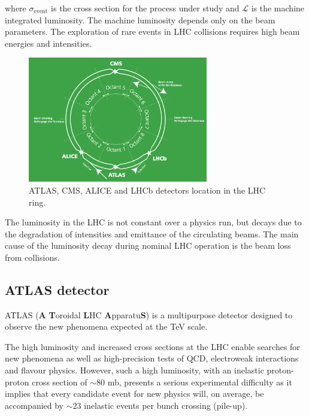 \documentclass[12pt, twoside]{article}
\numberwithin{equation}{section}
\numberwithin{figure}{section}
\begin{document}
where $\sigma_{\text{event}}$ is the cross section for the process under study and $\mathcal{L}$ is the machine integrated luminosity. The machine luminosity depends only on the beam parameters. The exploration of rare events in LHC collisions requires high beam energies and intensities.
\begin{figure}[h]
    \centering
    \includegraphics[width=0.7\textwidth]{./images/ExperimentsAtLHC.png}
    \captionsetup{width=0.9\textwidth}
    \caption{ATLAS, CMS, ALICE and LHCb detectors location in the LHC ring.}
    \label{fig:LHCScheme}
\end{figure}

The luminosity in the LHC is not constant over a physics run, but decays due to the degradation of intensities and emittance of the circulating beams. The main cause of the luminosity decay during nominal LHC operation is the beam loss from collisions.

\subsection{ATLAS detector}
\label{subsec:ATLASDetector}

ATLAS (\textbf{A} \textbf{T}oroidal \textbf{L}HC \textbf{A}pparatu\textbf{S}) is a multipurpose detector designed to observe the new phenomena expected at the TeV scale.

The high luminosity and increased cross sections at the LHC enable searches for new phenomena as well as high-precision tests of QCD, electroweak interactions and flavour physics. However, such a high luminosity, with an inelastic proton-proton cross section of $\sim 80$ mb, presents a serious experimental difficulty as it implies that every candidate event for new physics will, on average, be accompanied by $\sim 23$ inelastic events per bunch crossing (pile-up).
\end{document}
